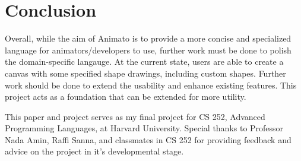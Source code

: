 \documentclass[acmsmall,screen]{acmart}
\begin{document}
\section{Conclusion}
Overall, while the aim of Animato is to provide a more concise and specialized language for animators/developers to use, further work must be done to polish the domain-specific langauge.
At the current state, users are able to create a canvas with some specified shape drawings, including custom shapes.
Further work should be done to extend the usability and enhance existing features.
This project acts as a foundation that can be extended for more utility.

\begin{acks}
This paper and project serves as my final project for CS 252, Advanced Programming Languages, at Harvard University. Special thanks to Professor Nada Amin, Raffi Sanna, and classmates in CS 252 for providing feedback and advice on the project in it's developmental stage.
\end{acks}



\end{document}
